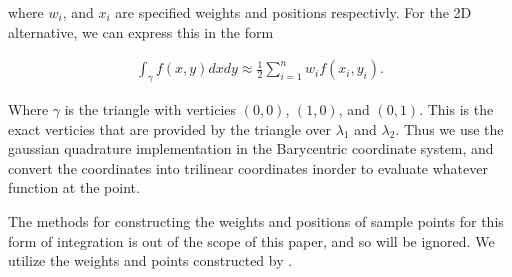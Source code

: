 \documentclass[../fem.tex]{subfiles}
\begin{document}
where $w_i$, and $x_i$ are specified weights and positions respectivly. For the
2D alternative, we can express this in the form

\begin{align*}
  \int_\gamma f(x,y) dxdy\approx \frac{1}{2}\sum_{i=1}^nw_if(x_i,y_i).
\end{align*}

Where $\gamma$ is the triangle with verticies $(0,0)$, $(1,0)$, and $(0,1)$.
This is the exact verticies that are provided by the triangle over $\lambda_1$
and $\lambda_2$. Thus we use the gaussian quadrature implementation in the
Barycentric coordinate system, and convert the coordinates into trilinear
coordinates inorder to evaluate whatever function at the point.

The methods for constructing the weights and positions of sample points for
this form of integration is out of the scope of this paper, and so will be
ignored. We utilize the weights and points constructed by \cite{GQ}.
\end{document}
